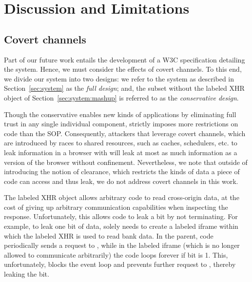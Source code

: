 \section{Discussion and Limitations}
\label{sec:discussion}


\subsection{Covert channels}
\label{sec:discussion:covert}

Part of our future work entails the development of a W3C
specification detailing the \sys{} system.
%
Hence, we must consider the effects of covert channels.
%
To this end, we divide our system into two designs:
%
we refer to the system as described in
Section~\ref{sec:system} as the \emph{full design};
and, the subset without the labeled XHR object of
Section~\ref{sec:system:mashup} is referred to as the
\emph{conservative design}.

Though the conservative \sys{} enables new kinds of applications by
eliminating full trust in any single individual component, \sys{}
strictly imposes more restrictions on code than the SOP.
%
Consequently, attackers that leverage covert channels, which are
introduced by races to shared resources, such as caches, schedulers,
etc. to leak information in a browser with \sys{} will leak at most as
much information as a version of the browser without confinement.
%
Nevertheless, we note that outside of introducing the notion of
clearance, which restricts the kinds of data a piece of code can
access and thus leak, we do not address covert channels in this work. 

%


The labeled XHR object allows arbitrary code to read cross-origin
data, at the cost of giving up arbitrary communication capabilities
when inspecting the response.
%
Unfortunately, this allows code to leak a bit by not terminating.
%
For example, to leak one bit of  data, 
solely needs to create a labeled iframe within which the labeled XHR
is used to read bank data.
%
In the parent, code periodically sends a request to ,
while in the labeled iframe (which is no longer allowed to communicate
arbitrarily) the code loops forever if bit is 1.
%
This, unfortunately, blocks the event loop and prevents further
request to , thereby leaking the bit.



